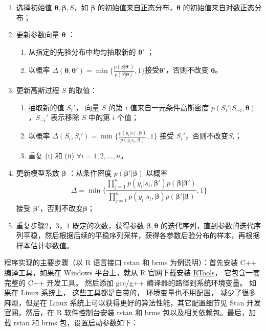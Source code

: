 \documentclass[12pt,a4paper,UTF8,twoside]{book}
\providecommand{\tightlist}{%
  \setlength{\itemsep}{0pt}\setlength{\parskip}{0pt}}
\theoremstyle{definition}
\theoremstyle{definition}
\theoremstyle{definition}
\theoremstyle{remark}
\begin{document}
\begin{enumerate}
\def\labelenumi{\arabic{enumi}.}
\tightlist
\item
  选择初始值 \(\boldsymbol{\theta},\boldsymbol{\beta},S\)，如 \(\boldsymbol{\beta}\) 的初始值来自正态分布，\(\boldsymbol{\theta}\) 的初始值来自对数正态分布；
\item
  更新参数向量 \(\boldsymbol{\theta}\) ：

  \begin{enumerate}
  \def\labelenumii{(\roman{enumii})}
  \tightlist
  \item
    从指定的先验分布中均匀抽取新的 \(\boldsymbol{\theta}'\) ；
  \item
    以概率 \(\Delta(\boldsymbol{\theta},\boldsymbol{\theta}') = \min \big\{\frac{p(S|\boldsymbol{\theta}')}{p(S|\boldsymbol{\theta})},1\big\}\)接受\(\boldsymbol{\theta}'\)，否则不改变 \(\boldsymbol{\theta}\)。
  \end{enumerate}
\item
  更新高斯过程 \(S\) 的取值：

  \begin{enumerate}
  \def\labelenumii{(\roman{enumii})}
  \tightlist
  \item
    抽取新的值 \(S_{i}'\)， 向量 \(S\) 的第 \(i\) 值来自一元条件高斯密度 \(p(S_{i}'|S_{-i},\boldsymbol{\theta})\)，\(S_{-i}'\) 表示移除 \(S\) 中的第 \(i\) 个值；
  \item
    以概率 \(\Delta(S_{i},S_{i}') = \min\big\{ \frac{p(y_{i}|s_{i}',\boldsymbol{\beta})}{p(y_{i}s_{i},\boldsymbol{\beta})},1 \big\}\) 接受 \(S_{i}'\)，否则不改变\(S_i\)；
  \item
    重复 (i) 和 (ii) \(\forall i = 1,2,\ldots,n\)。
  \end{enumerate}
\item
  更新模型系数 \(\boldsymbol{\beta}\) ：从条件密度 \(p(\boldsymbol{\beta}'|\boldsymbol{\beta})\) 以概率 \[\Delta = \min \big\{ \frac{\prod_{j=1}^{n}p(y_i|s_{i},\boldsymbol{\beta}')p(\boldsymbol{\beta}|\boldsymbol{\beta}')}{\prod_{j=1}^{n}p(y_i|s_{i},\boldsymbol{\beta})p(\boldsymbol{\beta}'|\boldsymbol{\beta})},1  \big\}\] 接受 \(\boldsymbol{\beta}'\)，否则不改变\(\boldsymbol{\beta}\)；
\item
  重复步骤2，3，4 既定的次数，获得参数 \(\boldsymbol{\beta},\boldsymbol{\theta}\) 的迭代序列，直到参数的迭代序列平稳，然后根据后续的平稳序列采样，获得各参数后验分布的样本，再根据样本估计参数值。
\end{enumerate}

程序实现的主要步骤（以 R 语言接口 rstan 和 brms 为例说明）：首先安装 C++ 编译工具，如果在 Windows 平台上，就从 R 官网下载安装 \href{https://cran.r-project.org/bin/windows/Rtools/}{RTools}， 它包含一套完整的 C++ 开发工具。 然后添加 gcc/g++ 编译器的路径到系统环境变量。 如果在 Linux 系统上， 这些工具都是自带的， 环境变量也不用配置， 减少了很多麻烦，但是在 Linux 系统上可以获得更好的算法性能，其它配置细节见 Stan 开发\href{https://github.com/stan-dev/rstan/wiki}{官网}。然后，在 R 软件控制台安装 rstan 和 brms 包以及相关依赖包。最后，加载 rstan 和 brms 包，设置启动参数如下：
\end{document}
